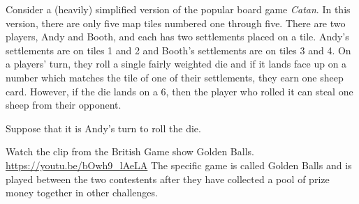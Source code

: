 \documentclass[addpoints]{exam}
\begin{document}
\begin{questions}

\newpage



\question%

Consider a (heavily) simplified version of the popular board game \textit{Catan}.
In this version, there are only five map tiles numbered one through five.
There are two players, Andy and Booth, and each has two settlements placed on a tile.
Andy's settlements are on tiles 1 and 2 and Booth's settlements are on tiles 3 and 4.
On a players' turn, they roll a single fairly weighted die and if it lands face up on a number which matches the tile of one of their settlements, they earn one sheep card.
However, if the die lands on a 6, then the player who rolled it can steal one sheep from their opponent.

Suppose that it is Andy's turn to roll the die.


\question

Watch the clip from the British Game show Golden Balls.
\url{https://youtu.be/bOwh9_lAeLA}
The specific game is called Golden Balls and is played between the two contestents after they have collected a pool of prize money together in other challenges.


\end{questions}
\end{document}
